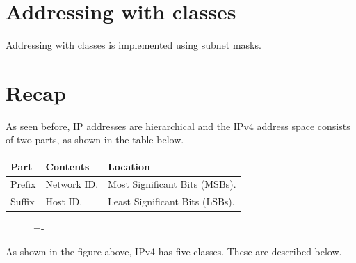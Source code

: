 \documentclass[a4paper]{systems-software}
\begin{document}
\section{Addressing with classes}

Addressing with classes is implemented using subnet masks.


\section*{Recap}

As seen before, IP addresses are hierarchical and the IPv4 address space consists of two parts, as shown in the table below.

\begin{longtabu} to \textwidth {| X[1,l] | X[1,l] | X[2,l] |}
	\hline
	\textbf{Part} & \textbf{Contents} & \textbf{Location}
	\\ \hline
	Prefix & Network ID. & Most Significant Bits (MSBs).
	\\ \hline
	Suffix & Host ID. & Least Significant Bits (LSBs).
	\\ \hline
\end{longtabu}

\begin{figure}[H]
	\lineskip=-\fboxrule
\end{figure}

As shown in the figure above, IPv4 has five classes. These are described below.
\end{document}
